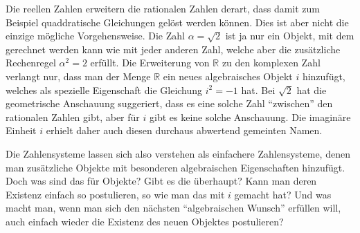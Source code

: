 Die reellen Zahlen erweitern die rationalen Zahlen derart, dass damit
zum Beispiel quaddratische Gleichungen gelöst werden können.
Dies ist aber nicht die einzige mögliche Vorgehensweise.
Die Zahl $\alpha=\sqrt{2}$ ist ja nur ein Objekt, mit dem gerechnet werden
kann wie mit jeder anderen Zahl, welche aber die zusätzliche Rechenregel
$\alpha^2=2$ erfüllt.
Die Erweiterung von $\mathbb{R}$ zu den komplexen Zahl verlangt nur,
dass man der Menge $\mathbb{R}$ ein neues algebraisches Objekt $i$
hinzufügt, welches als spezielle Eigenschaft die Gleichung $i^2=-1$ hat.
Bei $\sqrt{2}$ hat die geometrische Anschauung suggeriert, dass es eine
solche Zahl ``zwischen'' den rationalen Zahlen gibt, aber für $i$
gibt es keine solche Anschauung.
Die imaginäre Einheit $i$ erhielt daher auch diesen durchaus
abwertend gemeinten Namen.

Die Zahlensysteme lassen sich also verstehen als einfachere Zahlensysteme,
denen man zusätzliche Objekte mit besonderen algebraischen Eigenschaften
hinzufügt.
Doch was sind das für Objekte?
Gibt es die überhaupt?
Kann man deren Existenz einfach so postulieren, so wie man das mit $i$
gemacht hat?
Und was macht man, wenn man sich den nächsten ``algebraischen Wunsch''
erfüllen will, auch einfach wieder die Existenz des neuen Objektes
postulieren?

